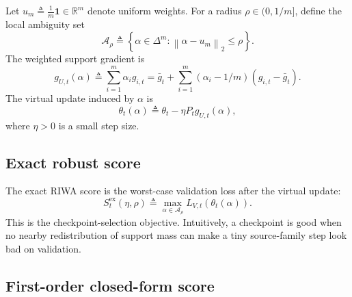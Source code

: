 \documentclass{article}
\newcommand{\RR}{\mathbb{R}}
\newcommand{\riwa}{\textup{\textsc{RIWA}}}
\newcommand{\simplex}{\Delta}
\newcommand{\norm}[1]{\left\lVert #1 \right\rVert}
\begin{document}
Let $u_m \triangleq \frac{1}{m}\mathbf{1} \in \RR^m$ denote uniform weights. For a radius $\rho \in (0,1/m]$, define the local ambiguity set
\begin{equation}
    \mathcal{A}_{\rho}
    \triangleq
    \left\{
    \alpha \in \simplex^m :
    \norm{\alpha - u_m}_2 \le \rho
    \right\}.
\end{equation}
The weighted support gradient is
\begin{equation}
    g_{U,t}(\alpha)
    \triangleq
    \sum_{i=1}^{m}\alpha_i g_{i,t}
    =
    \bar g_t + \sum_{i=1}^{m}(\alpha_i - 1/m)(g_{i,t}-\bar g_t).
\end{equation}
The virtual update induced by $\alpha$ is
\begin{equation}
    \theta_t(\alpha) \triangleq \theta_t - \eta P_t g_{U,t}(\alpha),
\end{equation}
where $\eta > 0$ is a small step size.

\subsection{Exact robust score}

The exact \riwa{} score is the worst-case validation loss after the virtual update:
\begin{equation}
    S_t^{\mathrm{ex}}(\eta,\rho)
    \triangleq
    \max_{\alpha \in \mathcal{A}_{\rho}}
    L_{V,t}(\theta_t(\alpha)).
    \label{eq:exact_score}
\end{equation}
This is the checkpoint-selection objective. Intuitively, a checkpoint is good when no nearby redistribution of support mass can make a tiny source-family step look bad on validation.

\subsection{First-order closed-form score}
\end{document}
